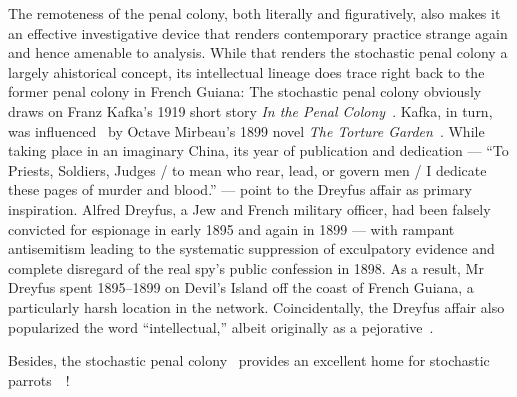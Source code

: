 The remoteness of the penal colony, both literally and figuratively, also makes
it an effective investigative device that renders contemporary practice strange
again and hence amenable to analysis. While that renders the stochastic penal
colony a largely ahistorical concept, its intellectual lineage does trace right
back to the former penal colony in French Guiana: The stochastic penal colony
obviously draws on Franz Kafka's 1919 short story \emph{In the Penal
Colony}~\cite{Kafka1995}. Kafka, in turn, was influenced~\cite{Robertson2017} by
Octave Mirbeau's 1899 novel \emph{The Torture Garden}~\cite{Mirbeau2008}. While
taking place in an imaginary China, its year of publication and dedication ---
``To Priests, Soldiers, Judges / to mean who rear, lead, or govern men / I
dedicate these pages of murder and blood.'' --- point to the Dreyfus affair as
primary inspiration. Alfred Dreyfus, a Jew and French military officer, had been
falsely convicted for espionage in early 1895 and again in 1899 --- with rampant
antisemitism leading to the systematic suppression of exculpatory evidence and
complete disregard of the real spy's public confession in 1898. As a result, Mr
Dreyfus spent 1895--1899 on Devil's Island off the coast of French Guiana, a
particularly harsh location in the network. Coincidentally, the Dreyfus affair
also popularized the word ``intellectual,'' albeit originally as a
pejorative~\cite{Drake2005,StudentsAtTheUniversityOfBristol2021}.

Besides, the stochastic penal colony~ provides an excellent
home for stochastic parrots~~\cite{BenderGebruea2021}!
